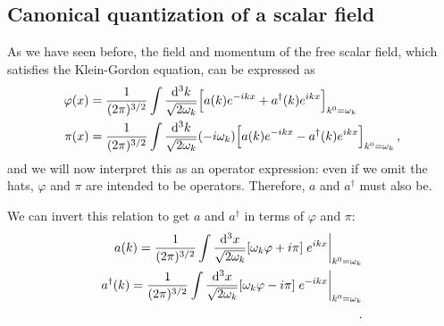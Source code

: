 \documentclass[main.tex]{subfiles}
\begin{document}
\subsection{Canonical quantization of a scalar field}

As we have seen before, the field and momentum of the free scalar field, which satisfies the Klein-Gordon equation, can be expressed as 
%
\begin{align}
\varphi (x) &= \frac{1}{(2\pi )^{3/2}} \int \frac{ \dd[3]{k}}{\sqrt{2 \omega_{k}}} \qty[a(k) e^{-ikx} + a^{\dag}(k) e^{ikx}]_{k^{0} =\omega_{k}} \\
\pi (x) &= \frac{1}{(2\pi )^{3/2}} \int \frac{ \dd[3]{k}}{\sqrt{2 \omega_{k}}} (-i \omega_{k}) \qty[a(k) e^{-ikx} - a^{\dag}(k) e^{ikx}]_{k^{0} =\omega_{k}} 
\,,
\end{align}
%
and we will now interpret this as an operator expression: even if we omit the hats, \(\varphi \) and \(\pi \) are intended to be operators. 
Therefore, \(a\) and \(a^{\dag}\) must also be. 

\begin{claim}
We can invert this relation to get \(a\) and \(a^{\dag}\) in terms of \(\varphi \) and \(\pi \): 
%
\begin{align}
    a(k) = \frac{1}{(2 \pi )^{3/2}} \int \frac{ \dd[3]{x}}{\sqrt{2 \omega_{k}}} \qty[\omega_{k} \varphi + i \pi ] \eval{e^{ikx}}_{k^{0}= \omega_{k}} \\
    a^{\dag}(k) = \frac{1}{(2 \pi )^{3/2}} \int \frac{ \dd[3]{x}}{\sqrt{2 \omega_{k}}} \qty[\omega_{k} \varphi - i \pi ] \eval{e^{-ikx}}_{k^{0}= \omega_{k}} \\
    \,.
\end{align}
\end{claim}
\end{document}

